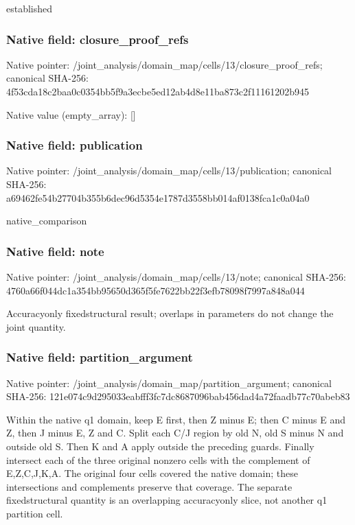 \documentclass[10pt,a4paper]{article}
\begin{document}
established


\subsubsection{Native field: closure\_proof\_refs}


Native pointer: /joint\_analysis/domain\_m\allowbreak{}ap/cells/13/closure\_proo\allowbreak{}f\_refs; canonical SHA-256: 4f53cda18c2baa0c0354bb5f\allowbreak{}9a3ecbe5ed12ab4d8e11ba87\allowbreak{}3c2f11161202b945



Native value (empty\_array): []



\subsubsection{Native field: publication}


Native pointer: /joint\_analysis/domain\_m\allowbreak{}ap/cells/13/publication; canonical SHA-256: a69462fe54b27704b355b6de\allowbreak{}c96d5354e1787d3558bb014a\allowbreak{}f0138fca1c0a04a0


native\_comparison


\subsubsection{Native field: note}


Native pointer: /joint\_analysis/domain\_m\allowbreak{}ap/cells/13/note; canonical SHA-256: 4760a66f044dc1a354bb9565\allowbreak{}0d365f5fe7622bb22f3efb78\allowbreak{}098f7997a848a044


Accuracyonly fixedstructural result; overlaps in parameters do not change the joint quantity.


\subsubsection{Native field: partition\_argument}


Native pointer: /joint\_analysis/domain\_m\allowbreak{}ap/partition\_argument; canonical SHA-256: 121e074c9d295033eabfff3f\allowbreak{}c7dc8687096bab456dad4a72\allowbreak{}faadb77c70abeb83


Within the native q1 domain, keep E first, then Z minus E; then C minus E and Z, then J minus E, Z and C. Split each C/J region by old N, old S minus N and outside old S. Then K and A apply outside the preceding guards. Finally intersect each of the three original nonzero cells with the complement of E,Z,C,J,K,A. The original four cells covered the native domain; these intersections and complements preserve that coverage. The separate fixedstructural quantity is an overlapping accuracyonly slice, not another q1 partition cell.
\end{document}
